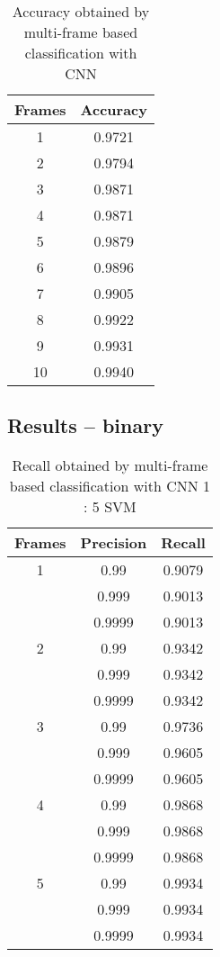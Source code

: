     \begin{table}[H]
      \begin{center}
      \small
      \caption{Accuracy obtained by multi-frame based classification with CNN}
      \begin{tabular}{ |c|c| }
      \hline
      Frames & Accuracy\\
      \hline
      1 & 0.9721\\
      \hline
      2 & 0.9794\\
      \hline
      3 & 0.9871\\
      \hline
      4 & 0.9871\\
      \hline
      5 & 0.9879\\
      \hline
      6 & 0.9896\\
      \hline
      7 & 0.9905\\
      \hline
      8 & 0.9922\\
      \hline
      9 & 0.9931\\
      \hline
      10 & 0.9940\\
      \hline
      \end{tabular}
      \end{center}
    \end{table}

    \subsection{Results -- binary}
    \begin{table}[H]
    \begin{center}
    \small
    \caption{Recall obtained by multi-frame based classification with CNN 1 : 5 SVM}
    \begin{tabular}{ |c|c|c| }
        \hline
        Frames & Precision & Recall\\
    \hline
    1 & 0.99 & 0.9079\\
    & 0.999 & 0.9013\\
    & 0.9999 & 0.9013\\
    \hline
    2 & 0.99 & 0.9342\\
    & 0.999 & 0.9342\\
    & 0.9999 & 0.9342\\
    \hline
    3 & 0.99 & 0.9736\\
    & 0.999 & 0.9605\\
    & 0.9999 & 0.9605\\
    \hline
    4 & 0.99 & 0.9868\\
    & 0.999 & 0.9868\\
    & 0.9999 & 0.9868\\
    \hline
    5 & 0.99 & 0.9934\\
    & 0.999 & 0.9934\\
    & 0.9999 & 0.9934\\
    \hline

    \end{tabular}
    \end{center}
    \end{table}

